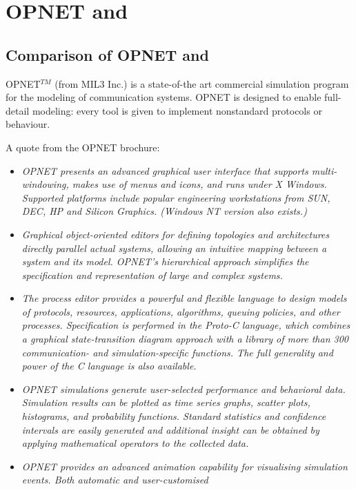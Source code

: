 \chapter{OPNET and {\opp}}
\label{cha:opnet-and-omnet}

\section{Comparison of OPNET and {\opp}}

OPNET$^{TM}$ (from MIL3 Inc.) is a state-of-the art commercial simulation
program for the modeling of communication systems. OPNET is designed
to enable full-detail modeling: every tool is given to implement
nonstandard protocols or behaviour.


A quote from the OPNET brochure:


\begin{itemize}
\item{\textit{OPNET presents an advanced graphical user
interface that supports multi-windowing, makes use of menus and
icons, and runs under X Windows. Supported platforms include
popular engineering workstations from SUN, DEC, HP and Silicon
Graphics. (Windows NT version also exists.)}}
\item{\textit{Graphical object-oriented editors for defining topologies
and architectures directly parallel actual systems, allowing
an intuitive mapping between a system and its model. OPNET's
hierarchical approach simplifies the specification and representation
of large and complex systems.}}
\item{\textit{The process editor provides a powerful and flexible
language to design models of protocols, resources, applications,
algorithms, queuing policies, and other processes. Specification
is performed in the Proto-C language, which combines a graphical
state-transition diagram approach with a library of more than
300 communication- and simulation-specific functions. The full
generality and power of the C language is also available.}}
\item{\textit{OPNET simulations generate user-selected performance
and behavioral data. Simulation results can be plotted as time
series graphs, scatter plots, histograms, and probability functions.
Standard statistics and confidence intervals are easily generated
and additional insight can be obtained by applying mathematical
operators to the collected data. }}
\item{\textit{OPNET provides an advanced animation capability for
visualising simulation events. Both automatic and user-customised
}}
\end{itemize}
